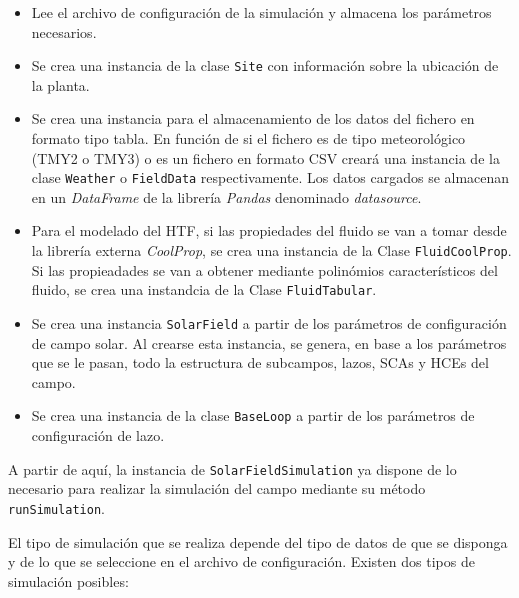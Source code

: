\begin{itemize}
\item
  Lee el archivo de configuración de la simulación y almacena los parámetros necesarios.
\item
  Se crea una instancia de la clase \texttt{Site} con información sobre la ubicación   de la planta.
\item
  Se crea una instancia para el almacenamiento de los datos del fichero en  formato tipo tabla. En función de si el fichero es de tipo   meteorológico (TMY2 o TMY3) o es un fichero en formato CSV creará una   instancia de la clase \texttt{Weather} o \texttt{FieldData} respectivamente. Los datos   cargados se almacenan en un \emph{DataFrame} de la librería \emph{Pandas} denominado  \emph{datasource}.
\item
   Para el modelado del HTF, si las propiedades del fluido se van a tomar desde la librería externa  \emph{CoolProp}, se crea una instancia de la Clase  \texttt{FluidCoolProp}. Si las propieadades se van a obtener mediante polinómios característicos del fluido, se crea una instandcia de la Clase \texttt{FluidTabular}.
\item
  Se crea una instancia \texttt{SolarField} a partir de los parámetros de configuración de campo solar. Al crearse esta instancia, se genera, en base a los parámetros que se le pasan, todo la estructura de subcampos, lazos, SCAs y HCEs del campo.
\item
  Se crea una instancia de la clase \texttt{BaseLoop} a partir de los parámetros de configuración de lazo.
\end{itemize}

A partir de aquí, la instancia de \texttt{SolarFieldSimulation} ya dispone de lo necesario para realizar la simulación del campo mediante su método \texttt{runSimulation}.

El tipo de simulación que se realiza depende del tipo de datos de que se disponga y de lo que se seleccione en el archivo de configuración. Existen dos tipos de simulación posibles:

